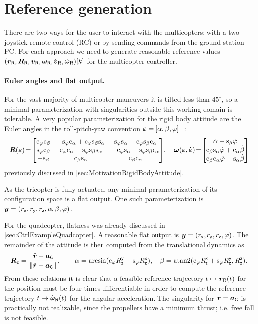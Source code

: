 \section{Reference generation}
There are two ways for the user to interact with the multicopters: with a two-joystick remote control (RC) or by sending commands from the ground station PC.
For each approach we need to generate reasonable reference values $(\rR, \RR, \vR, \wR, \vRd, \wRd)[k]$ for the multicopter controller.

\paragraph{Euler angles and flat output.}
For the vast majority of multicopter maneuvers it is tilted less than $45^\circ$, so a minimal parameterization with singularities outside this working domain is tolerable.
A very popular parameterization for the rigid body attitude are the Euler angles in the roll-pitch-yaw convention $\tuple{\varepsilon} = [\rol, \pit, \yaw]^\top$:
\begin{align}\label{eq:RealizationEulerAngles}
 \R(\tuple{\varepsilon}) \!=\!
 \begin{bmatrix}
  \cyaw \cpit & -\syaw \crol+\cyaw \spit \srol & \syaw \srol+\cyaw \spit \crol \\
  \syaw \cpit & \cyaw \crol+\syaw \spit \srol & -\cyaw \srol+\syaw \spit \crol \\
  -\spit & \cpit \srol & \cpit \crol  
 \end{bmatrix}\!,
\quad
 \w(\tuple{\varepsilon}, \dot{\tuple{\varepsilon}}) \!=\!
 \begin{bmatrix} 
  \rold - \spit \yawd \\
  \cpit \srol \yawd + \crol \pitd\\
  \cpit \crol \yawd - \srol \pitd
 \end{bmatrix}
\end{align}
previously discussed in \autoref{sec:MotivationRigidBodyAttitude}.

As the tricopter is fully actuated, any minimal parameterization of its configuration space is a flat output.
One such parameterization is $\tuple{y} = (\rx, \ry, \rz, \rol, \pit, \yaw)$.

For the quadcopter, flatness was already discussed in \autoref{sec:CtrlExampleQuadcopter}.
A reasonable flat output is $\tuple{y} = (\rx, \ry, \rz, \yaw)$.
The remainder of the attitude is then computed from the translational dynamics as
\begin{align}\label{eq:RealizationQuatFlatness}
 \Rz = \frac{\rdd - \gravityAcc}{\norm{\rdd - \gravityAcc}},
\qquad
 \rol = \arcsin(\cyaw \Ryz - \syaw\Rxz),
\quad
 \pit = \atanTwo(\cyaw\Rxz + \syaw \Ryz, \Rzz).
\end{align}
From these relations it is clear that a feasible reference trajectory $t\mapsto \rR(t)$ for the position must be four times differentiable in order to compute the reference trajectory $t\mapsto\wRd(t)$ for the angular acceleration.
The singularity for $\rdd = \gravityAcc$ is practically not realizable, since the propellers have a minimum thrust; i.e. free fall is not feasible.


